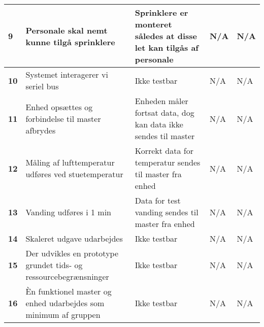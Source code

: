 \begin{center}
\begin{longtable}{|p{}|p{}|p{}|p{}|p{}|}
\textbf{9}	&Personale skal nemt kunne tilgå sprinklere
			&Sprinklere er monteret således at disse let kan tilgås af personale
			&N/A
			&N/A \\ \hline 
			
\textbf{10}	&Systemet interagerer vi seriel bus
			&Ikke testbar
			&N/A
			&N/A \\ \hline 
			
			
\textbf{11}	&Enhed opsættes og forbindelse til master afbrydes
			&Enheden måler fortsat data, dog kan data ikke sendes til master
			&N/A
			&N/A \\ \hline 
			
\textbf{12}	&Måling af lufttemperatur udføres ved stuetemperatur
			&Korrekt data for temperatur sendes til master fra enhed
			&N/A
			&N/A \\ \hline 
			
\textbf{13}	&Vanding udføres i 1 min 
			&Data for test vanding sendes til master fra enhed
			&N/A
			&N/A \\ \hline 
			
			
\textbf{14}	&Skaleret udgave udarbejdes
			&Ikke testbar
			&N/A
			&N/A \\ \hline 
			
\textbf{15}	&Der udvikles en prototype grundet tids- og ressourcebegrænsninger
			&Ikke testbar
			&N/A
			&N/A \\ \hline 
			
\textbf{16}	&Èn funktionel master og enhed udarbejdes som minimum af gruppen
			&Ikke testbar
			&N/A
			&N/A \\ \hline 
			
\end{longtable}
	\label{ATIFKrav} 
\end{center}


